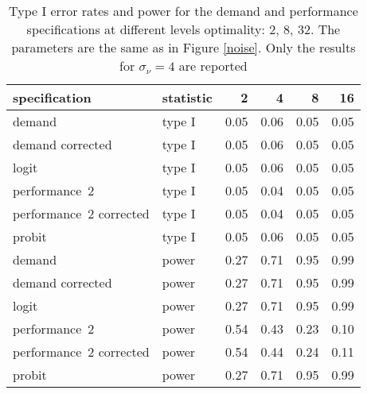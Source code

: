 \begin{table}[ht]
\centering
\begingroup\footnotesize
\begin{tabular}{llrrrr}
  \hline
specification & statistic & 2 & 4 & 8 & 16 \\ 
  \hline
demand & type I & 0.05 & 0.06 & 0.05 & 0.05 \\ 
  demand corrected & type I & 0.05 & 0.06 & 0.05 & 0.05 \\ 
  logit & type I & 0.05 & 0.06 & 0.05 & 0.05 \\ 
  performance~2 & type I & 0.05 & 0.04 & 0.05 & 0.05 \\ 
  performance~2 corrected & type I & 0.05 & 0.04 & 0.05 & 0.05 \\ 
  probit & type I & 0.05 & 0.06 & 0.05 & 0.05 \\ 
  demand & power & 0.27 & 0.71 & 0.95 & 0.99 \\ 
  demand corrected & power & 0.27 & 0.71 & 0.95 & 0.99 \\ 
  logit & power & 0.27 & 0.71 & 0.95 & 0.99 \\ 
  performance~2 & power & 0.54 & 0.43 & 0.23 & 0.10 \\ 
  performance~2 corrected & power & 0.54 & 0.44 & 0.24 & 0.11 \\ 
  probit & power & 0.27 & 0.71 & 0.95 & 0.99 \\ 
   \hline
\end{tabular}
\endgroup
\caption{Type I error rates and power for the demand 
  and performance specifications at different levels optimality: 
  2, 8, 32. The parameters are the same as in Figure \ref{noise}.
  Only the results for $\sigma_{\nu} = 4$ are reported} 
\label{noise-table}
\end{table}

